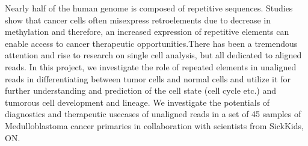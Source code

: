 \documentclass[10pt,letterpaper]{moderncv}
\begin{document}

{}{Nearly half of the human genome is composed of repetitive sequences. Studies show that cancer cells often misexpress retroelements due to decrease in methylation and therefore, an increased expression of repetitive elements can enable access to cancer therapeutic opportunities.There has been a tremendous attention and rise to research on single cell analysis, but all dedicated to aligned reads. In this project, we investigate the role of repeated elements in unaligned reads in differentiating between tumor cells and normal cells and utilize it for further understanding and prediction of the cell state (cell cycle etc.) and tumorous cell development and lineage. We investigate the potentials of diagnostics and therapeutic usecases of unaligned reads in a set of 45 samples of Medulloblastoma cancer primaries in collaboration with scientists from SickKids, ON.}
\end{document}
